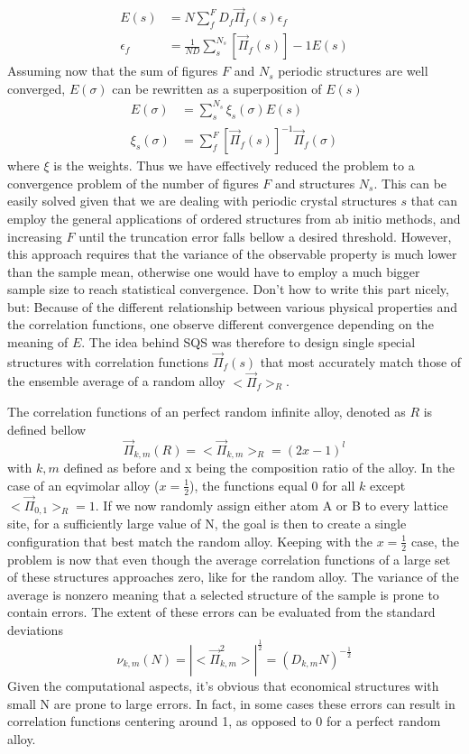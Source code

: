 \begin{align}
E(s) &= N\sum_{f}^{F} D_f \vec{\Pi}_f (s)\epsilon_f \\     
\epsilon_f &= \frac{1}{ND}\sum_{s}^{N_s}[\vec{\Pi}_f (s)]-1E(s)
\end{align}
Assuming now that the sum of figures $F$ and $N_s$ periodic structures are well converged, $E(\sigma)$ can be rewritten as a superposition of $E(s)$
\begin{align}
    E(\sigma) &= \sum_{s}^{N_s}\xi_s(\sigma)E(s) \\
    \xi_s(\sigma) &= \sum_{f}^{F}[\vec{\Pi}_f(s)]^{-1}\vec{\Pi}_f(\sigma)    
\end{align}
where $\xi$ is the weights. Thus we have effectively reduced the problem to a convergence problem of the number of figures $F$ and structures $N_s$. This can be easily solved given that we are dealing with periodic crystal structures ${s}$ that can employ the general applications of ordered structures from ab initio methods, and increasing $F$ until the truncation error falls bellow a desired threshold. However, this approach requires that the variance of the observable property is much lower than the sample mean, otherwise one would have to employ a much bigger sample size to reach statistical convergence. Don't how to write this part nicely, but: Because of the different relationship between various physical properties and the correlation functions, one observe different convergence depending on the meaning of $E$. The idea behind SQS was therefore to design single special structures with correlation functions ${\vec{\Pi}_f(s)}$ that most accurately match those of the ensemble average of a random alloy $<\vec{\Pi}_f>_R$. 

The correlation functions of an perfect random infinite alloy, denoted as $R$ is defined bellow
\begin{equation}
    \vec{\Pi}_{k,m}(R) = <\vec{\Pi}_{k,m}>_R = (2x-1)^l 
\end{equation}
with $k, m$ defined as before and x being the composition ratio of the alloy. In the case of an eqvimolar alloy ($x=\frac{1}{2}$), the functions equal 0 for all $k$ except $<\vec{\Pi}_{0,1}>_R = 1$. If we now randomly assign either atom A or B to every lattice site, for a sufficiently large value of N, the goal is then to create a single configuration that best match the random alloy. Keeping with the $x=\frac{1}{2}$ case, the problem is now that even though the average correlation functions of a large set of these structures approaches zero, like for the random alloy. The variance of the average is nonzero meaning that a selected structure of the sample is prone to contain errors. The extent of these errors can be evaluated from the standard deviations
\begin{equation}
    \nu_{k,m}(N) = |<\vec{\Pi}^{2}_{k,m}>|^{\frac{1}{2}} = (D_{k,m}N)^{-\frac{1}{2}}
\end{equation}
Given the computational aspects, it's obvious that economical structures with small N are prone to large errors. In fact, in some cases these errors can result in correlation functions centering around 1, as opposed to 0 for a perfect random alloy.  

